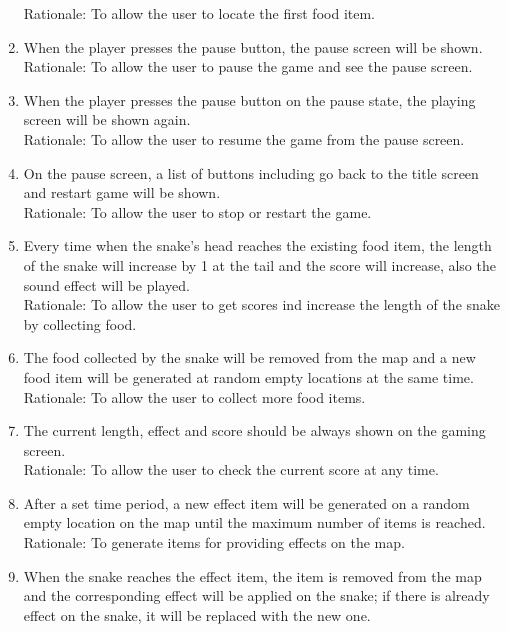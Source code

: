 \documentclass[12pt, titlepage]{article}
\begin{document}
\begin{enumerate}[{FR}1.]
        \color{red} Rationale: To allow the user to locate the first food item. \color{black}
    \item When the player presses the pause button, the pause screen will be shown.\\
        \color{red} Rationale: To allow the user to pause the game and see the pause screen. \color{black}
    \item When the player presses the pause button on the pause state, the playing screen will be shown again.\\
        \color{red} Rationale: To allow the user to resume the game from the pause screen. \color{black}
    \item On the pause screen, a list of buttons including go back to the title screen and restart game will be shown.\\
        \color{red} Rationale: To allow the user to stop or restart the game. \color{black}
    \item Every time when the snake's head reaches the existing food item, the length of the snake will increase by 1 at the tail and the score will increase, also the sound effect will be played.\\
        \color{red} Rationale: To allow the user to get scores ind increase the length of the snake by collecting food. \color{black}
    \item The food collected by the snake will be removed from the map and a new food item will be generated at random empty locations at the same time.\\
        \color{red} Rationale: To allow the user to collect more food items. \color{black}
    \item The current length, effect and score should be always shown on the gaming screen.\\
        \color{red} Rationale: To allow the user to check the current score at any time. \color{black}
    \item After a set time period, a new effect item will be generated on a random empty location on the map until the maximum number of items is reached.\\
        \color{red} Rationale: To generate items for providing effects on the map. \color{black}
    \item When the snake reaches the effect item, the item is removed from the map and the corresponding effect will be applied on the snake; if there is already effect on the snake, it will be replaced with the new one.\\

\end{enumerate}
\end{document}
